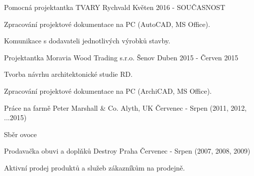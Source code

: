 

\begin{cventries}

    \cventry
    {Pomocná projektantka} %
    {TVARY} %
    {Rychvald} %
    {Květen 2016 - SOUČASNOST} %
    {
      \begin{cvitems} %
        \item {Zpracování projektové dokumentace na PC (AutoCAD, MS Office).}
        \item {Komunikace s dodavateli jednotlivých výrobků stavby.}
      \end{cvitems}
    }
    \cventry
    {Projektantka} %
    {Moravia Wood Trading s.r.o.} %
    {Šenov} %
    {Duben 2015 - Červen 2015} %
    {
      \begin{cvitems} %
        \item {Tvorba návrhu architektonické studie RD.}
        \item {Zpracování projektové dokumentace na PC (ArchiCAD, MS Office).}
      \end{cvitems}
    }
    \cventry
    {Práce na farmě}
    {Peter Marshall \& Co.}
    {Alyth, UK}
    {Červenec - Srpen (2011, 2012, ...2015)}
    {
    \begin{cvitems}
      \item {Sběr ovoce}
    \end{cvitems}
    }
    \cventry
    {Prodavačka obuvi a doplňků}
    {Destroy}
    {Praha}
    {Červenec - Srpen (2007, 2008, 2009)}
    {
    \begin{cvitems}
      \item {Aktivní prodej produktů a služeb zákazníkům na prodejně.}
    \end{cvitems}
    }
  

\end{cventries}
